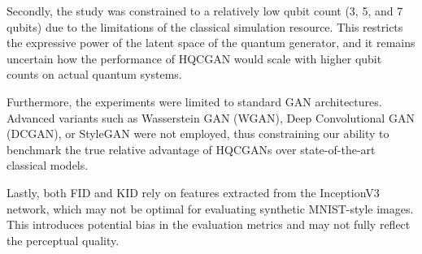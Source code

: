 Secondly, the study was constrained to a relatively low qubit count (3, 5, and 7 qubits) due to the limitations of the classical simulation resource. This restricts the expressive power of the latent space of the quantum generator, and it remains uncertain how the performance of HQCGAN would scale with higher qubit counts on actual quantum systems.

Furthermore, the experiments were limited to standard GAN architectures. Advanced variants such as Wasserstein GAN (WGAN), Deep Convolutional GAN (DCGAN), or StyleGAN were not employed, thus constraining our ability to benchmark the true relative advantage of HQCGANs over state-of-the-art classical models.

Lastly, both FID and KID rely on features extracted from the InceptionV3 network, which may not be optimal for evaluating synthetic MNIST-style images. This introduces potential bias in the evaluation metrics and may not fully reflect the perceptual quality.